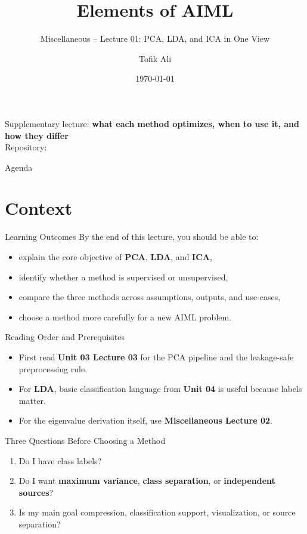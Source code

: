 \documentclass[aspectratio=169]{beamer}
\title[Elements of AIML]{Elements of AIML}
\subtitle{Miscellaneous -- Lecture 01: PCA, LDA, and ICA in One View}
\author{Tofik Ali}
\institute{School of Computer Science, UPES Dehradun}
\date{\today}
\begin{document}
\UPESCoverFrame
\setcounter{framenumber}{0}

\begin{frame}
  \titlepage
  \vspace{0.3em}
  \begin{center}
    \footnotesize Supplementary lecture: \textbf{what each method optimizes, when to use it, and how they differ}\\[0.25em]
    \footnotesize Repository: \texttt{\AIMLRepoURL}
  \end{center}
  \slidesources{\AIMLMiscSources}
\end{frame}

\begin{frame}{Agenda}
  \tableofcontents
\end{frame}

\section{Context}

\begin{frame}{Learning Outcomes}
  By the end of this lecture, you should be able to:
  \begin{itemize}[<+->]
    \item explain the core objective of \textbf{PCA}, \textbf{LDA}, and \textbf{ICA},
    \item identify whether a method is supervised or unsupervised,
    \item compare the three methods across assumptions, outputs, and use-cases,
    \item choose a method more carefully for a new AIML problem.
  \end{itemize}
\end{frame}

\begin{frame}{Reading Order and Prerequisites}
  \begin{itemize}[<+->]
    \item First read \textbf{Unit 03 Lecture 03} for the PCA pipeline and the leakage-safe preprocessing rule.
    \item For \textbf{LDA}, basic classification language from \textbf{Unit 04} is useful because labels matter.
    \item For the eigenvalue derivation itself, use \textbf{Miscellaneous Lecture 02}.
  \end{itemize}
\end{frame}

\begin{frame}{Three Questions Before Choosing a Method}
  \begin{enumerate}[<+->]
    \item Do I have class labels?
    \item Do I want \textbf{maximum variance}, \textbf{class separation}, or \textbf{independent sources}?
    \item Is my main goal compression, classification support, visualization, or source separation?
  \end{enumerate}
\end{frame}
\end{document}
